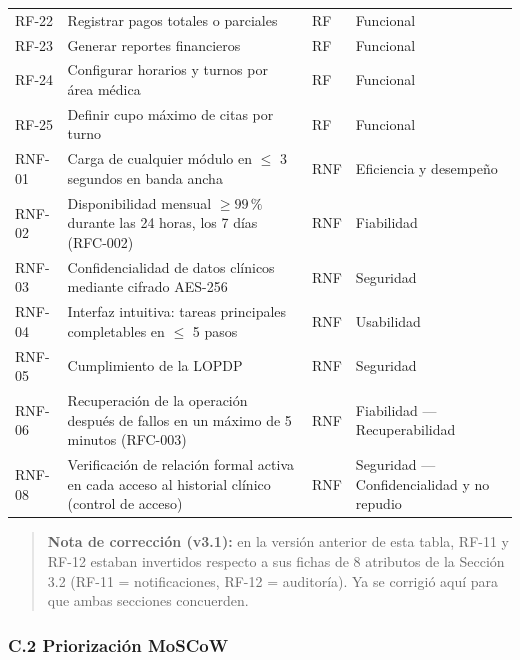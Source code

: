 \documentclass[11pt,a4paper]{article}
\begin{document}
\begin{longtable}{p{} p{} p{} p{}}
		RF-22 & Registrar pagos totales o parciales & RF & Funcional \\
		RF-23 & Generar reportes financieros & RF & Funcional \\
		RF-24 & Configurar horarios y turnos por área médica & RF & Funcional \\
		RF-25 & Definir cupo máximo de citas por turno & RF & Funcional \\
		RNF-01 & Carga de cualquier módulo en \(\leq\) 3 segundos en banda ancha & RNF & Eficiencia y desempeño \\
		RNF-02 & Disponibilidad mensual \(\geq 99\,\%\) durante las 24 horas, los 7 días (RFC-002) & RNF & Fiabilidad \\
		RNF-03 & Confidencialidad de datos clínicos mediante cifrado AES-256 & RNF & Seguridad \\
		RNF-04 & Interfaz intuitiva: tareas principales completables en \(\leq\) 5 pasos & RNF & Usabilidad \\
		RNF-05 & Cumplimiento de la LOPDP & RNF & Seguridad \\
		RNF-06 & Recuperación de la operación después de fallos en un máximo de 5 minutos (RFC-003) & RNF & Fiabilidad --- Recuperabilidad \\
		RNF-08 & Verificación de relación formal activa en cada acceso al historial clínico (control de acceso) & RNF & Seguridad --- Confidencialidad y no repudio \\
		
		
		
	\end{longtable}
	
	\begin{quote}
		\textbf{Nota de corrección (v3.1):} en la versión anterior de esta tabla, RF-11 y RF-12 estaban invertidos respecto a sus fichas de 8 atributos de la Sección 3.2 (RF-11 = notificaciones, RF-12 = auditoría). Ya se corrigió aquí para que ambas secciones concuerden.
	\end{quote}
	
	\subsubsection{C.2 Priorización MoSCoW}
	
\end{document}
